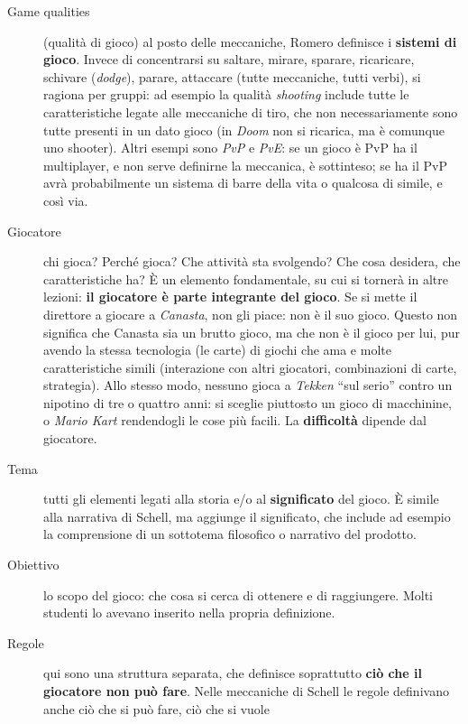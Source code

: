 \begin{description}
  \item[Game qualities] (qualità di gioco) al posto delle meccaniche, Romero
        definisce i \textbf{sistemi di gioco}. Invece di concentrarsi su
        saltare, mirare, sparare, ricaricare, schivare (\emph{dodge}), parare,
        attaccare (tutte meccaniche, tutti verbi), si ragiona per gruppi:
        ad esempio la qualità \emph{shooting} include tutte le caratteristiche
        legate alle meccaniche di tiro, che non necessariamente sono tutte
        presenti in un dato gioco (in \emph{Doom} non si ricarica, ma è
        comunque uno shooter). Altri esempi sono \emph{PvP} e \emph{PvE}: se un
        gioco è PvP ha il multiplayer, e non serve definirne la meccanica, è
        sottinteso; se ha il PvP avrà probabilmente un sistema di barre della
        vita o qualcosa di simile, e così via.
  \item[Giocatore] chi gioca? Perché gioca? Che attività sta svolgendo? Che
        cosa desidera, che caratteristiche ha? È un elemento fondamentale, su
        cui si tornerà in altre lezioni: \textbf{il giocatore è parte
        integrante del gioco}. Se si mette il direttore a giocare a
        \emph{Canasta}, non gli piace: non è il suo gioco. Questo non significa
        che Canasta sia un brutto gioco, ma che non è il gioco per lui, pur
        avendo la stessa tecnologia (le carte) di giochi che ama e molte
        caratteristiche simili (interazione con altri giocatori, combinazioni
        di carte, strategia). Allo stesso modo, nessuno gioca a \emph{Tekken}
        ``sul serio'' contro un nipotino di tre o quattro anni: si sceglie
        piuttosto un gioco di macchinine, o \emph{Mario Kart} rendendogli le
        cose più facili. La \textbf{difficoltà} dipende dal giocatore.
  \item[Tema] tutti gli elementi legati alla storia e/o al
        \textbf{significato} del gioco. È simile alla narrativa di Schell, ma
        aggiunge il significato, che include ad esempio la comprensione di un
        sottotema filosofico o narrativo del prodotto.
  \item[Obiettivo] lo scopo del gioco: che cosa si cerca di ottenere e di
        raggiungere. Molti studenti lo avevano inserito nella propria
        definizione.
  \item[Regole] qui sono una struttura separata, che definisce soprattutto
        \textbf{ciò che il giocatore non può fare}. Nelle meccaniche di Schell
        le regole definivano anche ciò che si può fare, ciò che si vuole

\end{description}
